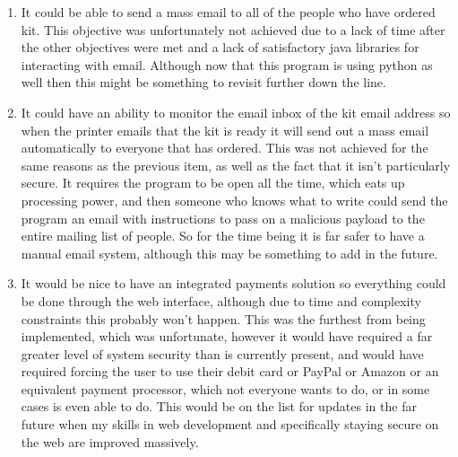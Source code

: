 \documentclass[
11pt, %
a4paper, %
oneside, %
headinclude,footinclude, %
BCOR5mm, %
]{scrartcl}
\begin{document}
\begin{enumerate}
	\item It could be able to send a mass email to all of the people who have ordered kit. This objective was unfortunately not achieved due to a lack of time after the other objectives were met and a lack of satisfactory java libraries for interacting with email. Although now that this program is using python as well then this might be something to revisit further down the line.
	\item It could have an ability to monitor the email inbox of the kit email address so when the printer emails that the kit is ready it will send out a mass email automatically to everyone that has ordered. This was not achieved for the same reasons as the previous item, as well as the fact that it isn't particularly secure. It requires the program to be open all the time, which eats up processing power, and then someone who knows what to write could send the program an email with instructions to pass on a malicious payload to the entire mailing list of people. So for the time being it is far safer to have a manual email system, although this may be something to add in the future.
	\item It would be nice to have an integrated payments solution so everything could be done through the web interface, although due to time and complexity constraints this probably won’t happen. This was the furthest from being implemented, which was unfortunate, however it would have required a far greater level of system security than is currently present, and would have required forcing the user to use their debit card or PayPal or Amazon or an equivalent payment processor, which not everyone wants to do, or in some cases is even able to do. This would be on the list for updates in the far future when my skills in web development and specifically staying secure on the web are improved massively. 
\end{enumerate}
\end{document}
